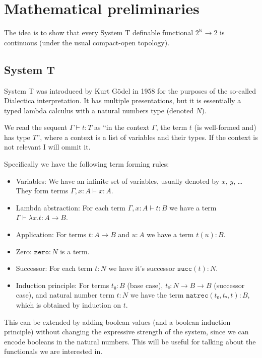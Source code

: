 \documentclass{article}
\def\natrec{\texttt{natrec}}
\def\zero{\texttt{zero}}
\def\suc{\texttt{succ}}
\begin{document}
\section{Mathematical preliminaries}
The idea is to show that every System T definable functional \(2^ℕ → 2\) is
continuous (under the usual compact-open topology).

\subsection{System T}
System T was introduced by Kurt Gödel in 1958 for the purposes of the so-called
Dialectica interpretation\cite{dialectica}. It has multiple presentations, but it is essentially
a typed lambda calculus with a natural numbers type (denoted \(N\)).

We read the sequent \(Γ ⊢ t : T\) as ``in the context \(Γ\), the term \(t\) (is
well-formed and) has type \(T\)'', where a context is a list of variables and
their types. If the context is not relevant I will ommit it.

Specifically we have the following term forming rules:
\begin{itemize}
\item Variables: We have an infinite set of variables, usually denoted by \(x\),
  \(y\), … They form terms \(Γ, x : A ⊢ x : A\).
\item Lambda abstraction: For each term \(Γ, x : A ⊢ t : B\) we have a term
  \(Γ ⊢ λx. t : A → B\).
\item Application: For terms \(t : A → B\) and \(u : A\) we have a term \(t(u) : B\).
\item Zero: \(\zero : N\) is a term.
\item Successor: For each term \(t : N\) we have it's successor \(\suc(t) : N\).
\item Induction principle: For terms \(t₀ : B\) (base case), \({tₛ : N → B → B}\)
  (successor case), and natural number term \(t : N\) we have the term
  \({\natrec(t₀, tₛ, t) : B}\), which is obtained by induction on \(t\).
\end{itemize}

This can be extended by adding boolean values (and a boolean induction
principle) without changing the expressive strength of the system, since we can
encode booleans in the natural numbers.
This will be useful for talking about the functionals we are interested in.
\end{document}
